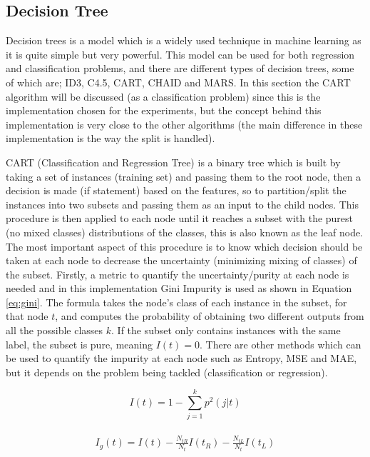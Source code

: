 \subsection{Decision Tree}\label{ssec:decisiontree}
Decision trees is a model which is a widely used technique in machine learning as it is quite simple but very powerful. This model can be used for both regression and classification problems, and there are different types of decision trees, some of which are; ID3, C4.5, CART, CHAID and MARS. In this section the CART algorithm will be discussed (as a classification problem) since this is the implementation chosen for the experiments, but the concept behind this implementation is very close to the other algorithms (the main difference in these implementation is the way the split is handled).

\noindent CART (Classification and Regression Tree) \cite{breiman1984classification} is a binary tree which is built by taking a set of instances (training set) and passing them to the root node, then a decision is made (if statement) based on the features, so to partition/split the instances into two subsets and passing them as an input to the child nodes. This procedure is then applied to each node until it reaches a subset with the purest (no mixed classes) distributions of the classes, this is also known as the leaf node.        
\noindent The most important aspect of this procedure is to know which decision should be taken at each node to decrease the uncertainty (minimizing mixing of classes) of the subset. Firstly, a metric to quantify the uncertainty/purity at each node is needed and in this implementation Gini Impurity \cite{gini1912variabilita} is used as shown in Equation \eqref{eq:gini}. The formula takes the node’s class of each instance in the subset, for that node \(t\), and computes the probability of obtaining two different outputs from all the possible classes \(k\). If the subset only contains instances with the same label, the subset is pure, meaning \(I(t) = 0\). There are other methods which can be used to quantify the impurity at each node such as Entropy, MSE and MAE, but it depends on the problem being tackled (classification or regression).
\begin{multicols}{2}
    \begin{equation} \label{eq:gini}
        I(t) = 1 - \sum_{j=1}^{k} p^2(j|t) 
    \end{equation} 
    \\
    \begin{equation} \label{eq:infogain}
        \begin{aligned}
           I_g(t) = I(t) - \frac{N_{tR}}{N_t} I(t_R) - \frac{N_{tL}}{N_t} I(t_L) 
        \end{aligned}
    \end{equation}
\end{multicols}
